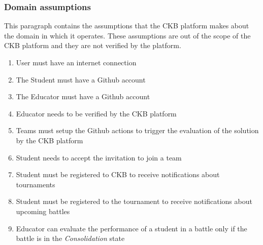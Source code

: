 \subsubsection{Domain assumptions}
This paragraph contains the assumptions that the CKB platform makes about the domain in which it operates. These assumptions are out of the scope of the CKB platform and they are not verified by the platform.

\begin{enumerate}[label=D\arabic*:]
    \item User must have an internet connection
    \item The Student must have a Github account
    \item The Educator must have a Github account
    \item Educator needs to be verified by the CKB platform
    \item Teams must setup the Github actions to trigger the evaluation of the solution by the CKB platform
    \item Student needs to accept the invitation to join a team
    \item Student must be registered to CKB to receive notifications about tournaments
    \item Student must be registered to the tournament to receive notifications about upcoming battles
    \item Educator can evaluate the performance of a student in a battle only if the battle is in the \textit{Consolidation} state
\end{enumerate}